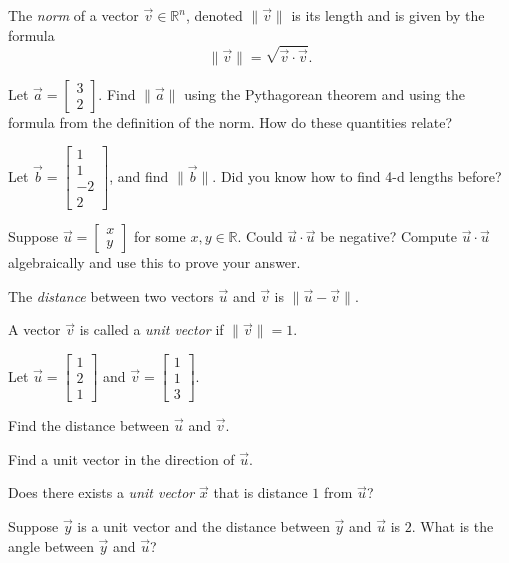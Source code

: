 \documentclass[14pt]{problemset}
\newcommand{\R}{\mathbb{R}}
\newcommand{\mat}[1]{\begin{bmatrix}#1\end{bmatrix}}
\begin{document}
	\newpage
	\begin{definition}[Norm]
		The \emph{norm} of a vector $\vec v\in\R^n$, denoted $\|\vec v\|$ is its length
		and is given by the formula
		\[
			\|\vec v\| = \sqrt{\vec v\cdot\vec v}.
		\]
	\end{definition}

	\question
	\begin{parts}
		\item Let $\vec a = \mat{3\\2}$.  Find $\|\vec a\|$ using the Pythagorean theorem
			and using the formula from the definition of the norm.  How do
			these quantities relate?
		\item Let $\vec b = \mat{1\\1\\-2\\2}$, and find $\|\vec b\|$.
		Did you know how to find 4-d lengths before?
	
		\item Suppose $\vec u=\mat{x\\ y}$ for some $x,y\in \R$.
		Could $\vec u\cdot \vec u$ be negative? Compute $\vec u\cdot \vec u$ algebraically
		and use this to prove your answer.
	\end{parts}

	\begin{definition}[Distance]
		The \emph{distance} between two vectors $\vec u$ and $\vec v$ is $\|\vec u-\vec v\|$.
	\end{definition}
	\begin{definition}
		A vector $\vec v$ is called a \emph{unit vector} if $\|\vec v\|=1$.
	\end{definition}
	
	\question
	Let $\vec u=\mat{1\\2\\1}$ and $\vec v=\mat{1\\1\\3}$.
	\begin{parts}
		\item Find the distance between $\vec u$ and $\vec v$.
		\item Find a unit vector in the direction of $\vec u$.
		\item Does there exists a \emph{unit vector} $\vec x$ that is distance
			$1$ from $\vec u$?
		\item Suppose $\vec y$ is a unit vector and the distance between $\vec y$ and
			$\vec u$ is $2$.  What is the angle between $\vec y$ and $\vec u$?
	\end{parts}
\end{document}
